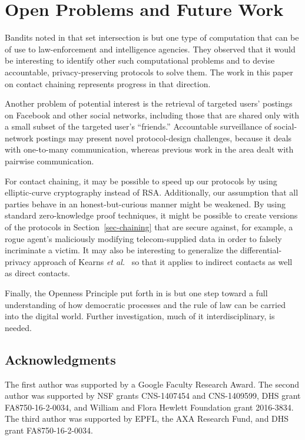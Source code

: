 \section{Open Problems and Future Work}\label{sec-future}
Bandits noted in \cite[Section 6.1]{sff-foci2014} that
set intersection is but one type of computation that can be of use
to law-enforcement and intelligence agencies.  They observed that it 
would be interesting to identify other such computational problems 
and to devise accountable, privacy-preserving protocols to solve them.  
The work in this paper on contact chaining represents progress in that
direction.  

Another problem of potential interest is the retrieval of
targeted users' postings on Facebook and other social networks, including 
those that are shared only with a small subset of the targeted user's 
``friends.'' Accountable surveillance of social-network postings may present 
novel protocol-design challenges, because it deals with one-to-many 
communication, whereas previous work in the area dealt with pairwise 
communication.

For contact chaining, it may be possible to speed up our protocols by using
elliptic-curve cryptography instead of RSA. Additionally, our assumption that
all parties behave in an honest-but-curious manner might be weakened. By using
standard zero-knowledge proof techniques, it might be possible to create versions
of the protocols in Section~\ref{sec-chaining} that are secure against, for
example, a rogue agent's maliciously modifying telecom-supplied data in order
to falsely incriminate a victim. It may also be interesting to 
generalize the differential-privacy approach of Kearns {\it et 
al.}~\cite{krwy-pnas16} so that it applies to indirect contacts as well as
direct contacts.

Finally, the Openness Principle put forth in \cite{sff-foci2014} is but one step
toward a full understanding of how democratic processes and the rule of law
can be carried into the digital world.  Further investigation, much of it
interdisciplinary, is needed.

\subsection*{Acknowledgments}

The first author was supported by a Google Faculty Research Award.
The second author was supported by NSF grants CNS-1407454 and CNS-1409599, DHS grant FA8750-16-2-0034, and William and Flora Hewlett Foundation grant 2016-3834.
The third author was supported by EPFL, the AXA Research Fund, and DHS grant FA8750-16-2-0034.


